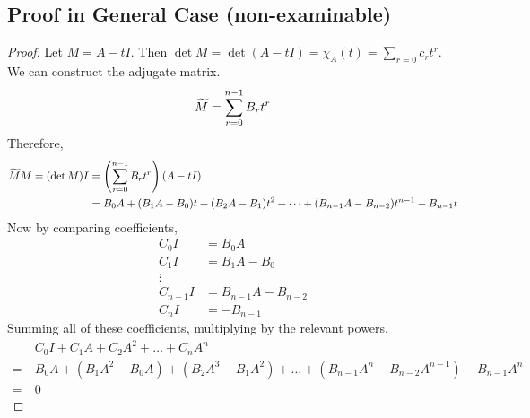 \documentclass{article}
\begin{document}
\subsection{Proof in General Case (non-examinable)}
\begin{proof}
	Let $M = A - tI$. Then $\det M = \det(A - tI) = \chi_A(t) = \sum_{r=0}c_rt^r$. We can construct the adjugate matrix.
	\[ \widetilde{M} = \sum_{r=0}^{n-1} B_rt^r \]
	Therefore,
	\begin{align*}
		\widetilde{M} M = (\det M) I & = \left(\sum_{r=0}^{n-1} B_rt^r\right)(A-tI)                                              \\
		                           & = B_0A + (B_1A - B_0)t + (B_2A - B_1)t^2 + \dots + (B_{n-1}A - B_{n-2})t^{n-1} - B_{n-1}t
	\end{align*}
	Now by comparing coefficients,
	\begin{align*}
		C_0I     & = B_0A               \\
		C_1I     & = B_1A - B_0         \\
		\vdots                          \\
		C_{n-1}I & = B_{n-1}A - B_{n-2} \\
		C_nI     & = -B_{n-1}
	\end{align*}
	Summing all of these coefficients, multiplying by the relevant powers,
	\begin{align*}
		 & C_0I + C_1A + C_2A^2 + \dots + C_nA^n \\=\ &B_0A + (B_1A^2 - B_0A) + (B_2A^3 - B_1A^2) + \dots + (B_{n-1}A^n - B_{n-2}A^{n-1}) - B_{n-1}A^n \\=\ &0
	\end{align*}
\end{proof}
\end{document}
